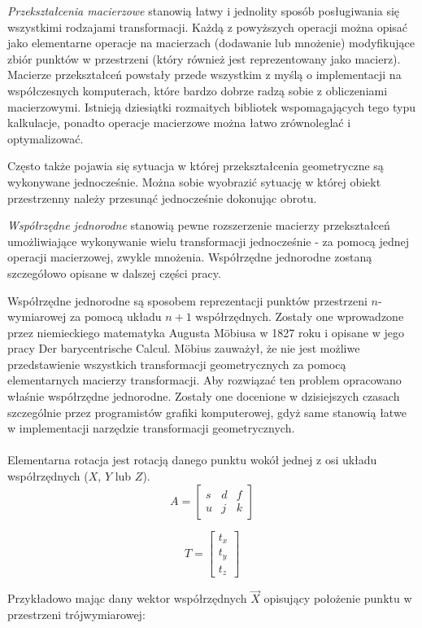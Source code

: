 \documentclass[licencjacka]{pracamgr}
\begin{document}
\textit{Przekształcenia macierzowe} stanowią łatwy i jednolity sposób posługiwania się wszystkimi rodzajami transformacji. Każdą z powyższych operacji można opisać jako elementarne operacje na macierzach (dodawanie lub mnożenie) modyfikujące zbiór punktów w przestrzeni (który również jest reprezentowany jako macierz). Macierze przekształceń powstały przede wszystkim z myślą o implementacji na współczesnych komputerach, które bardzo dobrze radzą sobie z obliczeniami macierzowymi. Istnieją dziesiątki rozmaitych bibliotek wspomagających tego typu kalkulacje, ponadto operacje macierzowe można łatwo zrównoleglać i optymalizować.


Często także pojawia się sytuacja w której przekształcenia geometryczne są wykonywane jednocześnie. Można sobie wyobrazić sytuację w której obiekt przestrzenny należy przesunąć jednocześnie dokonując obrotu. 

\textit{Współrzędne jednorodne} stanowią pewne rozszerzenie macierzy przekształceń umożliwiające wykonywanie wielu transformacji jednocześnie - za pomocą jednej operacji macierzowej, zwykle mnożenia. Współrzędne jednorodne zostaną szczegółowo opisane w dalszej części pracy.

Współrzędne jednorodne są sposobem reprezentacji punktów przestrzeni $n$-wymiarowej za pomocą układu $n+1$ współrzędnych. Zostały one wprowadzone przez niemieckiego matematyka Augusta Möbiusa w 1827 roku i opisane w jego pracy Der barycentrische Calcul. Möbius zauważył, że nie jest możliwe przedstawienie wszystkich transformacji geometrycznych za pomocą elementarnych macierzy transformacji. Aby rozwiązać ten problem opracowano właśnie współrzędne jednorodne. Zostały one docenione w dzisiejszych czasach szczególnie przez programistów grafiki komputerowej, gdyż same stanowią łatwe w implementacji narzędzie transformacji geometrycznych.
\\
\\
Elementarna rotacja jest rotacją danego punktu wokół jednej z osi układu współrzędnych ($X$, $Y$ lub $Z$).
$$
A=\begin{bmatrix}
s & d & f \\
u & j & k
\end{bmatrix}
$$


$$
T=\begin{bmatrix}
t_x \\
t_y \\
t_z
\end{bmatrix}
$$

Przykładowo mając dany wektor współrzędnych $\vec{X}$ opisujący położenie punktu w przestrzeni trójwymiarowej:
\end{document}
